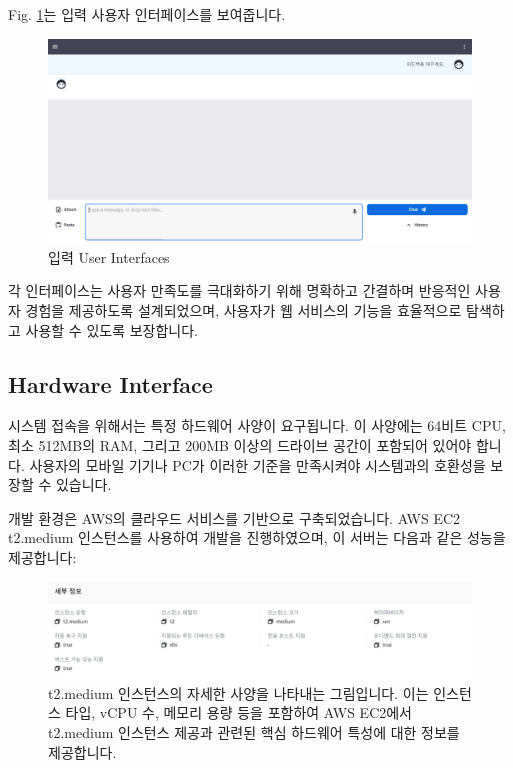 \documentclass[a4paper, 12pt]{article}
\begin{document}
Fig. \ref{fig:chat_input}는 입력 사용자 인터페이스를 보여줍니다.

\begin{figure}[H]
\centering
\includegraphics[width=1\textwidth]{img/chat_input.png}
\caption{입력 User Interfaces}
\label{fig:chat_input}
\end{figure}

각 인터페이스는 사용자 만족도를 극대화하기 위해 명확하고 간결하며 반응적인 사용자 경험을 제공하도록 설계되었으며, 사용자가 웹 서비스의 기능을 효율적으로 탐색하고 사용할 수 있도록 보장합니다.

\subsection{Hardware Interface}

시스템 접속을 위해서는 특정 하드웨어 사양이 요구됩니다. 이 사양에는 64비트 CPU, 최소 512MB의 RAM, 그리고 200MB 이상의 드라이브 공간이 포함되어 있어야 합니다. 사용자의 모바일 기기나 PC가 이러한 기준을 만족시켜야 시스템과의 호환성을 보장할 수 있습니다.

개발 환경은 AWS의 클라우드 서비스를 기반으로 구축되었습니다. AWS EC2 t2.medium 인스턴스를 사용하여 개발을 진행하였으며, 이 서버는 다음과 같은 성능을 제공합니다:

\begin{figure}[H]
\centering
\includegraphics[width=1\textwidth]{img/t2_medium_specific.png}
\caption{t2.medium 인스턴스의 자세한 사양을 나타내는 그림입니다. 이는 인스턴스 타입, vCPU 수, 메모리 용량 등을 포함하여 AWS EC2에서 t2.medium 인스턴스 제공과 관련된 핵심 하드웨어 특성에 대한 정보를 제공합니다.}
\label{fig:t2_medium_specific}
\end{figure}
\end{document}
